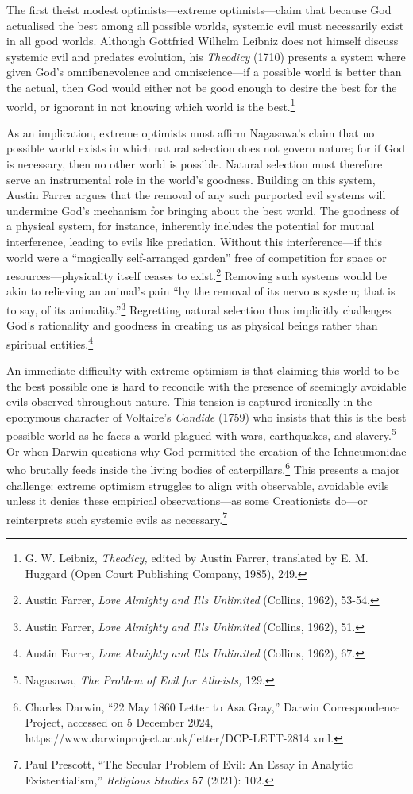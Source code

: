 The first theist modest optimists---extreme optimists---claim that
because God actualised the best among all possible worlds, systemic evil
must necessarily exist in all good worlds. Although Gottfried Wilhelm
Leibniz does not himself discuss systemic evil and predates evolution,
his \emph{Theodicy} (1710) presents a system where given God's
omnibenevolence and omniscience---if a possible world is better than the
actual, then God would either not be good enough to desire the best for
the world, or ignorant in not knowing which world is the
best.\footnote{G. W. Leibniz, \emph{Theodicy,} edited by Austin Farrer,
  translated by E. M. Huggard (Open Court Publishing Company, 1985),
  249.}

As an implication, extreme optimists must affirm Nagasawa's claim that
no possible world exists in which natural selection does not govern
nature; for if God is necessary, then no other world is possible.
Natural selection must therefore serve an instrumental role in the
world's goodness. Building on this system, Austin Farrer argues that the
removal of any such purported evil systems will undermine God's
mechanism for bringing about the best world. The goodness of a physical
system, for instance, inherently includes the potential for mutual
interference, leading to evils like predation. Without this
interference---if this world were a ``magically self-arranged garden''
free of competition for space or resources---physicality itself ceases
to exist.\footnote{Austin Farrer, \emph{Love Almighty and Ills
  Unlimited} (Collins, 1962), 53-54.} Removing such systems would
be akin to relieving an animal's pain ``by the removal of its nervous
system; that is to say, of its animality.''\footnote{Austin Farrer, \emph{Love Almighty and Ills Unlimited} (Collins, 1962), 51.}
Regretting natural selection thus implicitly challenges God's
rationality and goodness in creating us as physical beings rather than
spiritual entities.\footnote{Austin Farrer, \emph{Love Almighty and Ills
  Unlimited} (Collins, 1962), 67.}

An immediate difficulty with extreme optimism is that claiming this
world to be the best possible one is hard to reconcile with the presence
of seemingly avoidable evils observed throughout nature. This tension is
captured ironically in the eponymous character of Voltaire's
\emph{Candide} (1759) who insists that this is the best possible world
as he faces a world plagued with wars, earthquakes, and
slavery.\footnote{Nagasawa, \emph{The Problem of Evil for Atheists,}
  129.} Or when Darwin questions why God permitted the creation of the
Ichneumonidae who brutally feeds inside the living bodies of
caterpillars.\footnote{Charles Darwin, ``22 May 1860 Letter to Asa
  Gray,'' Darwin Correspondence Project, accessed on 5 December 2024,
  https://www.darwinproject.ac.uk/letter/DCP-LETT-2814.xml.} This
presents a major challenge: extreme optimism struggles to align with
observable, avoidable evils unless it denies these empirical
observations---as some Creationists do---or reinterprets such systemic
evils as necessary.\footnote{Paul Prescott, ``The Secular Problem of
  Evil: An Essay in Analytic Existentialism,'' \emph{Religious Studies}
  57 (2021): 102.}

